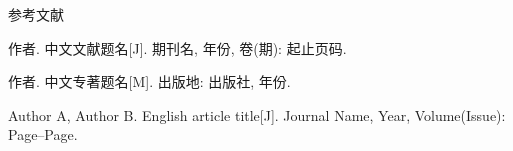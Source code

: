 \clearpage
{}
{}

\begin{center}
    {\FZhei{}\setlength{\baselineskip}{24pt}\selectfont 参考文献\par}
\end{center}

\begin{enumerate}[label={\textnormal{[\arabic*]}},leftmargin=2em]
    \item 作者. 中文文献题名[J]. 期刊名, 年份, 卷(期): 起止页码.
    \item 作者. 中文专著题名[M]. 出版地: 出版社, 年份.
    \item Author A, Author B. English article title[J]. Journal Name, Year, Volume(Issue): Page--Page.
\end{enumerate}

